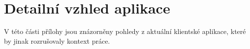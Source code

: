 \chapter{Detailní vzhled aplikace}
V této části přílohy jsou znázorněny pohledy z aktuální klientské aplikace, které by jinak rozrušovaly kontext práce.






